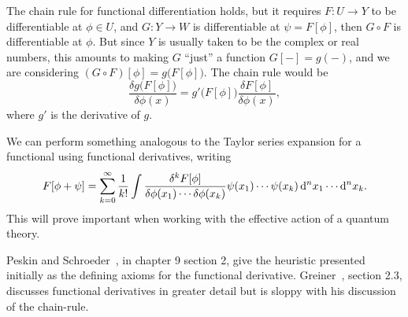 \begin{remark}
The chain rule for functional differentiation holds, but it requires
$F\colon U\to Y$ to be differentiable at $\phi\in U$, and $G\colon Y\to W$
is differentiable at $\psi=F[\phi]$, then $G\circ F$ is differentiable
at $\phi$. But since $Y$ is usually taken to be the complex or real
numbers, this amounts to making $G$ ``just'' a function $G[-]=g(-)$, and we are
considering $(G\circ F)[\phi] = g\bigl(F[\phi]\bigr)$. The chain rule
would be
\begin{equation}
\frac{\delta g\bigl(F[\phi]\bigr)}{\delta\phi(x)} = g'\bigl(F[\phi]\bigr)
\frac{\delta F[\phi]}{\delta\phi(x)},
\end{equation}
where $g'$ is the derivative of $g$.
\end{remark}

We can perform something analogous to the Taylor series expansion for a
functional using functional derivatives, writing
\begin{equation}
F[\phi + \psi] =\sum^{\infty}_{k=0}\frac{1}{k!}\int\frac{\delta^{k}F[\phi]}{\delta\phi(x_{1})\cdots\delta\phi(x_{k})}\psi(x_{1})\cdots\psi(x_{k})\,\mathrm{d}^{n}x_{1}\cdots\mathrm{d}^{n}x_{k}.
\end{equation}
This will prove important when working with the effective action of a
quantum theory.

Peskin and Schroeder~\cite{Peskin:1995ev}, in chapter 9 section 2, give
the heuristic presented initially as the defining axioms for the
functional derivative. Greiner~\cite{Greiner:1996zu}, section 2.3, discusses
functional derivatives in greater detail but is sloppy with his
discussion of the chain-rule.
